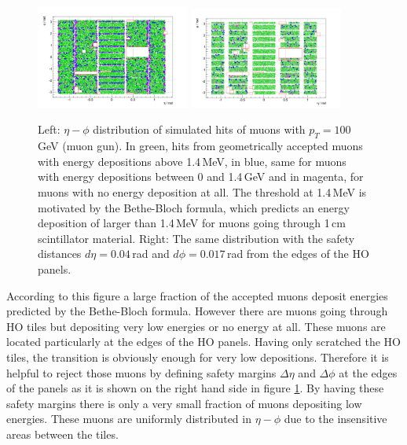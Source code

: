 			\begin{figure}[htbp]
				\centering
				\includegraphics[width=0.45\textwidth]{Figures/erdogan/simhits_wo_deta_dphi.png}
				\includegraphics[width=0.45\textwidth]{Figures/erdogan/simhits_with_deta_dphi.png}
				\caption{Left: $\eta-\phi$ distribution of simulated hits of muons with $p_T = 100$\,GeV (muon gun). In green, hits from geometrically accepted muons with energy depositions above 1.4\,MeV, in
				blue, same for muons with energy depositions between 0 and 1.4\,GeV and in magenta, for muons with no energy deposition at all. The threshold at 1.4\,MeV is motivated by the Bethe-Bloch formula,
				which predicts an energy deposition of larger than 1.4\,MeV for muons going through 1\,cm scintillator material. Right: The same distribution with the safety distances $d\eta = 0.04$\,rad and
				$d\phi = 0.017$\,rad from the edges of the HO panels.}
				\label{fig:simhits_in_acceptance}
			\end{figure}
			According to this figure a large fraction of the accepted muons deposit energies predicted by the Bethe-Bloch formula.
			However there are muons going through HO tiles but depositing very low energies or no energy at all.
			These muons are located particularly at the edges of the HO panels.
			Having only scratched the HO tiles, the transition is obviously enough for very low depositions.
			Therefore it is helpful to reject those muons by defining safety margins $\Delta\eta$ and $\Delta\phi$ at the edges of the panels as it is shown on the right hand side in figure
			\ref{fig:simhits_in_acceptance}.
			By having these safety margins there is only a very small fraction of muons depositing low energies.
			These muons are uniformly distributed in $\eta-\phi$ due to the insensitive areas between the tiles.
